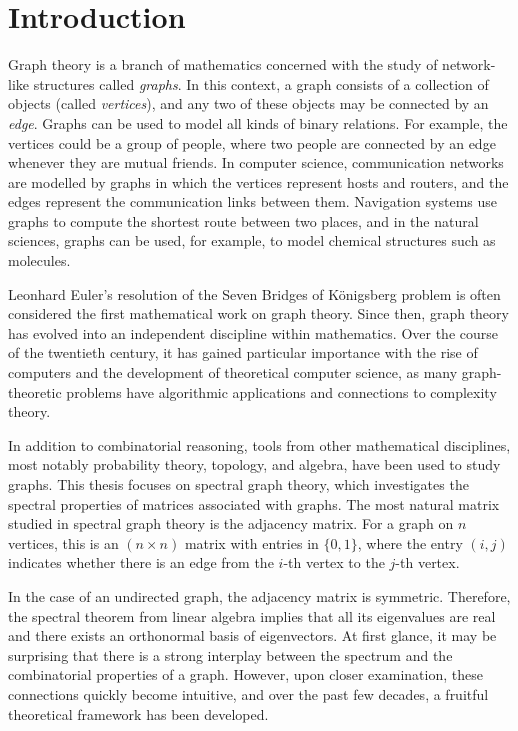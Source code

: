 \chapter{Introduction}

Graph theory is a branch of mathematics concerned with the study of network-like structures called \textit{graphs}.
In this context, a graph consists of a collection of objects (called \textit{vertices}), and any two of these objects may be connected by an \textit{edge}.
Graphs can be used to model all kinds of binary relations. 
For example, the vertices could be a group of people, where two people are connected by an edge whenever they are mutual friends.
In computer science, communication networks are modelled by graphs in which the vertices represent hosts and routers, and the edges represent the communication links between them. 
Navigation systems use graphs to compute the shortest route between two places, and in the natural sciences, graphs can be used, for example, to model chemical structures such as molecules. %

Leonhard Euler's resolution of the Seven Bridges of Königsberg problem \cite{solutio} is often considered the first mathematical work on graph theory.
Since then, graph theory has evolved into an independent discipline within mathematics.
Over the course of the twentieth century, it has gained particular importance with the rise of computers and the development of theoretical computer science, as many graph-theoretic problems have algorithmic applications and connections to complexity theory.

In addition to combinatorial reasoning, tools from other mathematical disciplines, most notably probability theory, topology, and algebra, have been used to study graphs.
This thesis focuses on spectral graph theory, which investigates the spectral properties of matrices associated with graphs. 
The most natural matrix studied in spectral graph theory is the adjacency matrix. 
For a graph on $n$ vertices, this is an $(n \times n)$ matrix with entries in $\{0, 1\}$, where the entry $(i, j)$ indicates whether there is an edge from the $i$-th vertex to the $j$-th vertex.

In the case of an undirected graph, the adjacency matrix is symmetric. 
Therefore, the spectral theorem from linear algebra implies that all its eigenvalues are real and there exists an orthonormal basis of eigenvectors.
At first glance, it may be surprising that there is a strong interplay between the spectrum and the combinatorial properties of a graph. 
However, upon closer examination, these connections quickly become intuitive, and over the past few decades, a fruitful theoretical framework has been developed.

